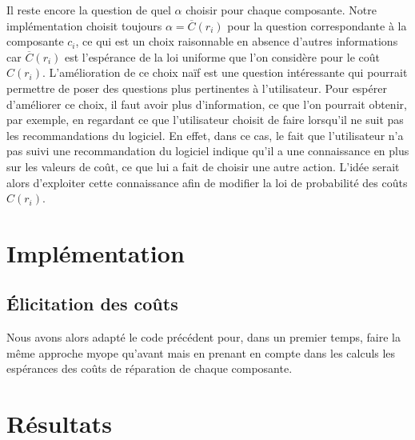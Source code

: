 \documentclass[a4paper,11pt]{article}
\theoremstyle{plain}
\theoremstyle{definition}
\begin{document}
Il reste encore la question de quel $\alpha$ choisir pour chaque composante. Notre implémentation choisit toujours $\alpha = \overline C(r_i)$ pour la question correspondante à la composante $c_i$, ce qui est un choix raisonnable en absence d'autres informations car $\overline C(r_i)$ est l'espérance de la loi uniforme que l'on considère pour le coût $C(r_i)$. L'amélioration de ce choix naïf est une question intéressante qui pourrait permettre de poser des questions plus pertinentes à l'utilisateur. Pour espérer d'améliorer ce choix, il faut avoir plus d'information, ce que l'on pourrait obtenir, par exemple, en regardant ce que l'utilisateur choisit de faire lorsqu'il ne suit pas les recommandations du logiciel. En effet, dans ce cas, le fait que l'utilisateur n'a pas suivi une recommandation du logiciel indique qu'il a une connaissance en plus sur les valeurs de coût, ce que lui a fait de choisir une autre action. L'idée serait alors d'exploiter cette connaissance afin de modifier la loi de probabilité des coûts $C(r_i)$.

\section{Implémentation}
\label{SecImplementation}



\subsection{Élicitation des coûts}

Nous avons alors adapté le code précédent pour, dans un premier temps, faire la même approche myope qu'avant mais en prenant en compte dans les calculs les espérances des coûts de réparation de chaque composante.

\section{Résultats}
\label{SecResultats}




\end{document}
